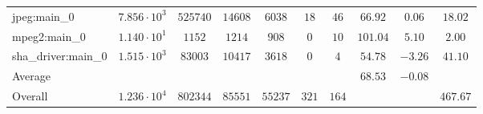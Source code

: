 \begin{tabular}{|l|c|c|c|c|c|c|c|c|c|}
jpeg:main\_0            & $ 7.856 \cdot 10^{3} $ & $ 525740 $ & $ 14608 $ & $ 6038  $ & $ 18  $ & $ 46  $ & $ 66.92       $ & $ 0.06    $ & $ 18.02   $ \\
mpeg2:main\_0           & $ 1.140 \cdot 10^{1} $ & $ 1152   $ & $ 1214  $ & $ 908   $ & $ 0   $ & $ 10  $ & $ 101.04      $ & $ 5.10    $ & $ 2.00    $ \\
sha\_driver:main\_0     & $ 1.515 \cdot 10^{3} $ & $ 83003  $ & $ 10417 $ & $ 3618  $ & $ 0   $ & $ 4   $ & $ 54.78       $ & $ -3.26   $ & $ 41.10   $ \\
\hline
Average                 & $                    $ & $        $ & $       $ & $       $ & $     $ & $     $ & $ 68.53       $ & $ -0.08   $ & $         $ \\
\hline
Overall                 & $ 1.236 \cdot 10^{4} $ & $ 802344 $ & $ 85551 $ & $ 55237 $ & $ 321 $ & $ 164 $ & $             $ & $         $ & $ 467.67  $ \\
\hline
\end{tabular}
